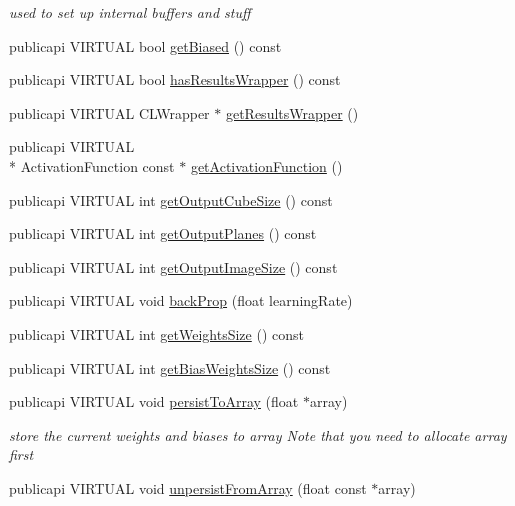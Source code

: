 \begin{DoxyCompactItemize}
\begin{DoxyCompactList}\small\item\em used to set up internal buffers and stuff \end{DoxyCompactList}\item 
publicapi V\-I\-R\-T\-U\-A\-L bool \hyperlink{classLayer_ab79827404ddcc0748363ee82f80f5500}{get\-Biased} () const 
\item 
publicapi V\-I\-R\-T\-U\-A\-L bool \hyperlink{classLayer_a6266a51eb760e512987aa8370d5c8c55}{has\-Results\-Wrapper} () const 
\item 
publicapi V\-I\-R\-T\-U\-A\-L C\-L\-Wrapper $\ast$ \hyperlink{classLayer_abe0fe88be13188358312b129deb688ac}{get\-Results\-Wrapper} ()
\item 
publicapi V\-I\-R\-T\-U\-A\-L \\*
Activation\-Function const $\ast$ \hyperlink{classLayer_a0ba9ca126aa2618018823555fb3c9737}{get\-Activation\-Function} ()
\item 
publicapi V\-I\-R\-T\-U\-A\-L int \hyperlink{classLayer_a4d3aab33b1ab977927e7e7358981b572}{get\-Output\-Cube\-Size} () const 
\item 
publicapi V\-I\-R\-T\-U\-A\-L int \hyperlink{classLayer_aca28b88a9ebe40c23fbc72f934980f65}{get\-Output\-Planes} () const 
\item 
publicapi V\-I\-R\-T\-U\-A\-L int \hyperlink{classLayer_ad7ab6a2cb6c247a3f076189b6b66e855}{get\-Output\-Image\-Size} () const 
\item 
publicapi V\-I\-R\-T\-U\-A\-L void \hyperlink{classLayer_a74464720a6019ee22eb57c4f876fb812}{back\-Prop} (float learning\-Rate)
\item 
publicapi V\-I\-R\-T\-U\-A\-L int \hyperlink{classLayer_a96234c95cad95b60c44ed0af11b712ba}{get\-Weights\-Size} () const 
\item 
publicapi V\-I\-R\-T\-U\-A\-L int \hyperlink{classLayer_af45c20c2d438d7d17f779e573ba6f784}{get\-Bias\-Weights\-Size} () const 
\item 
publicapi V\-I\-R\-T\-U\-A\-L void \hyperlink{classLayer_a678e0229b3aee66579ba920f11d2c24e}{persist\-To\-Array} (float $\ast$array)
\begin{DoxyCompactList}\small\item\em store the current weights and biases to array Note that you need to allocate array first \end{DoxyCompactList}\item 
publicapi V\-I\-R\-T\-U\-A\-L void \hyperlink{classLayer_ac4f7c0c62e9bab7c2075caf41a4ac027}{unpersist\-From\-Array} (float const $\ast$array)

\end{DoxyCompactItemize}
